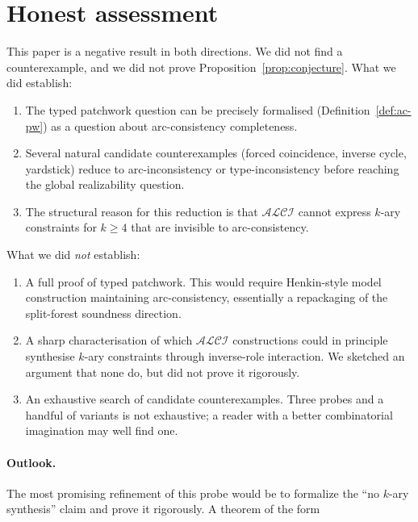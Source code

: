 \documentclass[11pt]{article}
\theoremstyle{definition}
\theoremstyle{remark}
\begin{document}
\section{Honest assessment}
\label{sec:honest}

This paper is a negative result in both directions.  We did not
find a counterexample, and we did not prove
Proposition~\ref{prop:conjecture}.  What we did establish:

\begin{enumerate}
  \item The typed patchwork question can be precisely formalised
    (Definition~\ref{def:ac-pw}) as a question about arc-consistency
    completeness.
  \item Several natural candidate counterexamples
    (forced coincidence, inverse cycle, yardstick) reduce to
    arc-inconsistency or type-inconsistency before reaching the
    global realizability question.
  \item The structural reason for this reduction is that
    $\mathcal{ALCI}$ cannot express $k$-ary constraints for
    $k \geq 4$ that are invisible to arc-consistency.
\end{enumerate}

What we did \emph{not} establish:

\begin{enumerate}
  \item A full proof of typed patchwork.  This would require
    Henkin-style model construction maintaining arc-consistency,
    essentially a repackaging of the split-forest soundness
    direction.
  \item A sharp characterisation of which $\mathcal{ALCI}$
    constructions could in principle synthesise $k$-ary constraints
    through inverse-role interaction.  We sketched an argument that
    none do, but did not prove it rigorously.
  \item An exhaustive search of candidate counterexamples.  Three
    probes and a handful of variants is not exhaustive; a reader
    with a better combinatorial imagination may well find one.
\end{enumerate}

\paragraph{Outlook.}  The most promising refinement of this probe
would be to formalize the ``no $k$-ary synthesis'' claim and prove
it rigorously.  A theorem of the form
\end{document}
